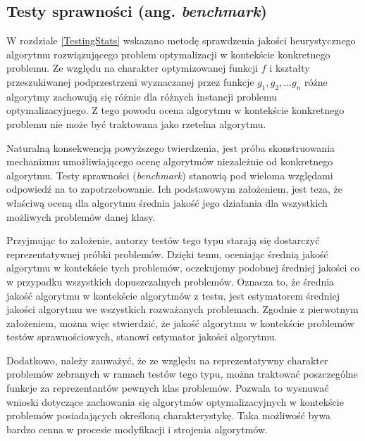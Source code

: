 \documentclass[12pt,a4paper]{report}
\begin{document}
{{{{{\subsection{Testy sprawności (ang. \emph{benchmark})}
\par{
W rozdziale \ref{TestingStats} wskazano metodę sprawdzenia jakości heurystycznego algorytmu rozwiązującego problem optymalizacji w kontekście konkretnego problemu. Ze względu na charakter optymizowanej funkcji $f$ i kształty przeszukiwanej podprzestrzeni wyznaczanej przez funkcje $g_1,g_2, \ldots g_n$ różne algorytmy zachowują się różnie dla różnych instancji problemu optymalizacyjnego. Z tego powodu ocena algorytmu w kontekście konkretnego problemu nie może być traktowana jako rzetelna algorytmu.
}
\par{
Naturalną konsekwencją powyższego twierdzenia, jest próba skonstruowania mechanizmu umożliwiającego ocenę algorytmów niezależnie od konkretnego algorytmu. Testy sprawności (\emph{benchmark}) stanowią pod wieloma względami odpowiedź na to zapotrzebowanie. Ich podstawowym założeniem, jest teza, że właściwą oceną dla algorytmu średnia jakość jego działania dla wszystkich możliwych problemów danej klasy.
}
\par{
Przyjmując to założenie, autorzy testów tego typu starają się dostarczyć reprezentatywnej próbki problemów. Dzięki temu, oceniając średnią jakość algorytmu w kontekście tych problemów, oczekujemy podobnej średniej jakości co w przypadku wszystkich dopuszczalnych problemów. Oznacza to, że średnia jakość algorytmu w kontekście algorytmów z testu, jest estymatorem średniej jakości algorytmu we wszystkich rozważanych problemach. Zgodnie z pierwotnym założeniem, można więc stwierdzić, że jakość algorytmu w kontekście problemów testów sprawnościowych, stanowi estymator jakości algorytmu.
}
\par{
Dodatkowo, należy zauważyć, że ze względu na reprezentatywny charakter problemów zebranych w ramach testów tego typu, można traktować poszczególne funkcje za reprezentantów pewnych klas problemów. Pozwala to wysnuwać wnioski dotyczące zachowania się algorytmów optymalizacyjnych w kontekście problemów posiadających określoną charakterystykę. Taka możliwość bywa bardzo cenna w procesie modyfikacji i strojenia algorytmów.
}
}}}}}
\end{document}
